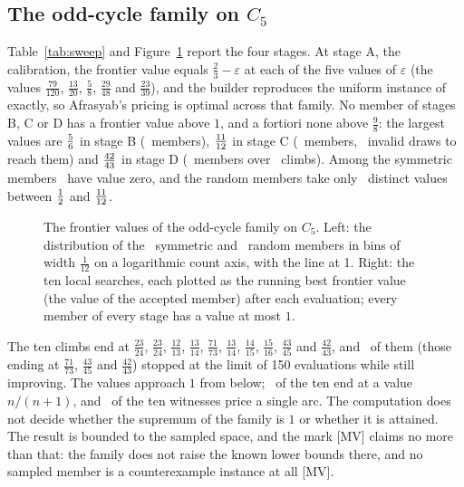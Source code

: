 \documentclass[11pt]{article}
\theoremstyle{remark}
\begin{document}
\subsection{The odd-cycle family on \texorpdfstring{$C_5$}{C5}}
\label{sec:oddcycle}

Table~\ref{tab:sweep} and Figure~\ref{fig:oddcycle} report the four stages. At stage A, the calibration, the frontier value equals $\tfrac23-\varepsilon$ at each of the five values of $\varepsilon$ (the values $\tfrac{79}{120}$, $\tfrac{13}{20}$, $\tfrac58$, $\tfrac{29}{48}$ and $\tfrac{23}{39}$), and the builder reproduces the uniform instance of \cite{Afr26} exactly, so Afrasyab's pricing is optimal across that family. No member of
stages B, C or D has a frontier value above $1$, and a fortiori none above $\tfrac98$: the largest values are $\tfrac{5}{6}$ in stage B (\nsixbcount\ members), $\tfrac{11}{12}$ in stage C (\nsixccount\ members, \ninvalid\ invalid draws to reach them) and $\tfrac{42}{43}$ in stage D (\nsixdcount\ members over \nstartsd\ climbs). Among the symmetric members \nsixbzero\ have value zero, and the random members take only \nsixcdistinct\ distinct values between $\tfrac{1}{2}$ and $\tfrac{11}{12}$.

\begin{figure}[t]
\centering

\caption{The frontier values of the odd-cycle family on $C_5$. Left: the distribution of the \nsixbcount\ symmetric and \nsixccount\ random members in bins of width $\tfrac1{12}$ on a logarithmic count axis, with the line at 1. Right: the ten local searches, each plotted as the running best frontier value (the value of the accepted member) after each evaluation; every member of every stage has a value at most $1$.}
\label{fig:oddcycle}
\end{figure}

The ten climbs end at $\tfrac{23}{24}$, $\tfrac{23}{24}$, $\tfrac{12}{13}$, $\tfrac{13}{14}$, $\tfrac{71}{73}$, $\tfrac{13}{14}$, $\tfrac{14}{15}$, $\tfrac{15}{16}$, $\tfrac{43}{45}$ and $\tfrac{42}{43}$, and \nsixdbudget\ of them (those ending at $\tfrac{71}{73}$, $\tfrac{43}{45}$ and $\tfrac{42}{43}$) stopped at the limit of 150 evaluations while still improving. The values approach $1$ from below; \nsixdnnp\ of the ten end at a value $n/(n+1)$, and \nsixdsingle\ of the ten witnesses price a single arc. The computation does not decide whether the supremum of the family is $1$ or whether it is attained. The result is bounded to the sampled space, and the mark [MV] claims no more than that: the family
does not raise the known lower bounds there, and no sampled member is a counterexample instance at all [MV].
\end{document}
